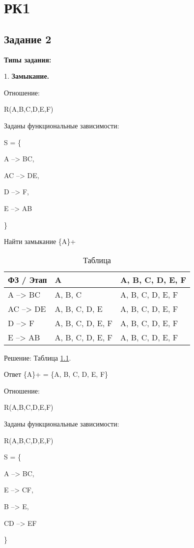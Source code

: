 \chapter{РК1}

\section{Задание 2}


\textbf{Типы задания:}

1. \textbf{Замыкание.}

Отношение:

R(A,B,C,D,E,F)

Заданы функциональные зависимости:

S = \{

A --> BC,

AC --> DE,

D --> F,

E --> AB

\}

Найти замыкание \{A\}+

\begin{table}[ht]
	\centering
	\begin{tabular}{ | l | l | l |}
		\hline
		ФЗ / Этап & A                & A, B, C, D, E, F \\ \hline
		A --> BC  & A, B, C          & A, B, C, D, E, F \\ \hline
		AC --> DE & A, B, C, D, E    & A, B, C, D, E, F \\ \hline
		D --> F   & A, B, C, D, E, F & A, B, C, D, E, F \\ \hline
		E --> AB  & A, B, C, D, E, F & A, B, C, D, E, F \\ \hline
		\hline
	\end{tabular}
	\caption{Таблица}
	\label{fig:ref11}
\end{table}

Решение: Таблица \ref{fig:ref11}.

Ответ \{A\}+ = \{A, B, C, D, E, F\}

Отношение:

R(A,B,C,D,E,F)

Заданы функциональные зависимости:

R(A,B,C,D,E,F)

S = \{

A --> BC,

E --> CF,

B --> E,

CD --> EF

\}

